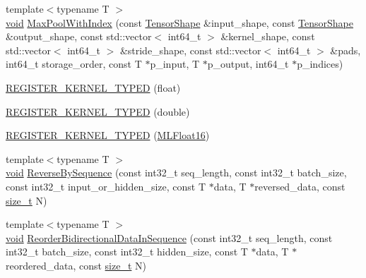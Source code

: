 \begin{DoxyCompactItemize}
\item 
{\footnotesize template$<$typename T $>$ }\\\mbox{\hyperlink{mlasi_8h_a88f941d423cb2a819b70a1358982b1a6}{void}} \mbox{\hyperlink{namespaceonnxruntime_1_1cuda_af278cd2a5888f6ee33d879ce0d43fd6f}{Max\+Pool\+With\+Index}} (const \mbox{\hyperlink{classonnxruntime_1_1TensorShape}{Tensor\+Shape}} \&input\+\_\+shape, const \mbox{\hyperlink{classonnxruntime_1_1TensorShape}{Tensor\+Shape}} \&output\+\_\+shape, const std\+::vector$<$ int64\+\_\+t $>$ \&kernel\+\_\+shape, const std\+::vector$<$ int64\+\_\+t $>$ \&stride\+\_\+shape, const std\+::vector$<$ int64\+\_\+t $>$ \&pads, int64\+\_\+t storage\+\_\+order, const T $\ast$p\+\_\+input, T $\ast$p\+\_\+output, int64\+\_\+t $\ast$p\+\_\+indices)
\item 
\mbox{\hyperlink{namespaceonnxruntime_1_1cuda_af003050f5b8619b8e14ded14ba00da08}{R\+E\+G\+I\+S\+T\+E\+R\+\_\+\+K\+E\+R\+N\+E\+L\+\_\+\+T\+Y\+P\+ED}} (float)
\item 
\mbox{\hyperlink{namespaceonnxruntime_1_1cuda_a5d1b624b414dba6dec6a829ce2442d5a}{R\+E\+G\+I\+S\+T\+E\+R\+\_\+\+K\+E\+R\+N\+E\+L\+\_\+\+T\+Y\+P\+ED}} (double)
\item 
\mbox{\hyperlink{namespaceonnxruntime_1_1cuda_a42cc720b053b6d4b0cd5fac89629e977}{R\+E\+G\+I\+S\+T\+E\+R\+\_\+\+K\+E\+R\+N\+E\+L\+\_\+\+T\+Y\+P\+ED}} (\mbox{\hyperlink{uniononnxruntime_1_1MLFloat16}{M\+L\+Float16}})
\item 
{\footnotesize template$<$typename T $>$ }\\\mbox{\hyperlink{mlasi_8h_a88f941d423cb2a819b70a1358982b1a6}{void}} \mbox{\hyperlink{namespaceonnxruntime_1_1cuda_a50c0e5c797779509d0ec1d12b475f238}{Reverse\+By\+Sequence}} (const int32\+\_\+t seq\+\_\+length, const int32\+\_\+t batch\+\_\+size, const int32\+\_\+t input\+\_\+or\+\_\+hidden\+\_\+size, const T $\ast$data, T $\ast$reversed\+\_\+data, const \mbox{\hyperlink{mlasi_8h_a503efbc1c6e50825320ad909366b78ab}{size\+\_\+t}} N)
\item 
{\footnotesize template$<$typename T $>$ }\\\mbox{\hyperlink{mlasi_8h_a88f941d423cb2a819b70a1358982b1a6}{void}} \mbox{\hyperlink{namespaceonnxruntime_1_1cuda_ace6d5943a8e890cfde1d3638b886fdcd}{Reorder\+Bidirectional\+Data\+In\+Sequence}} (const int32\+\_\+t seq\+\_\+length, const int32\+\_\+t batch\+\_\+size, const int32\+\_\+t hidden\+\_\+size, const T $\ast$data, T $\ast$reordered\+\_\+data, const \mbox{\hyperlink{mlasi_8h_a503efbc1c6e50825320ad909366b78ab}{size\+\_\+t}} N)
\item 

\end{DoxyCompactItemize}
